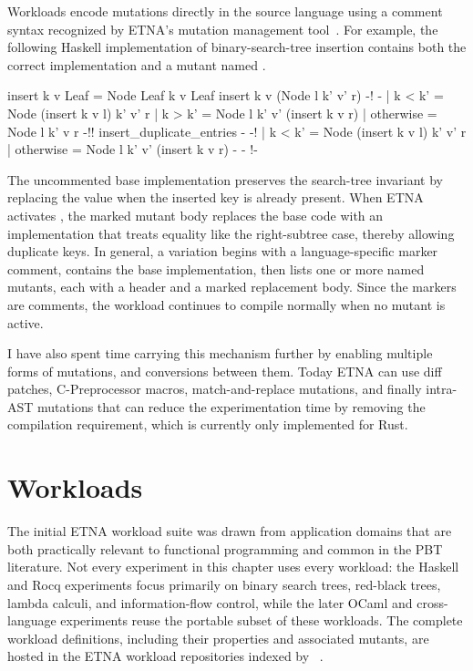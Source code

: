 Workloads encode mutations directly in the source language using a comment syntax
recognized by ETNA's mutation management tool~\cite{marauders}. For example, the
following Haskell implementation of binary-search-tree insertion contains both the
correct implementation and a mutant named .

\begin{code}[language=Haskell,emph={insert,Node,Leaf,otherwise},emph={[2]k,v,l,r,k',v'}]
insert k v Leaf = Node Leaf k v Leaf
insert k v (Node l k' v' r)
  {-! -}
  | k < k' = Node (insert k v l) k' v' r
  | k > k' = Node l k' v' (insert k v r)
  | otherwise = Node l k' v r
  {-!! insert_duplicate_entries -}
  {-!
  | k < k' = Node (insert k v l) k' v' r
  | otherwise = Node l k' v' (insert k v r)
  -}
  {- !-}
\end{code}

The uncommented base implementation preserves the search-tree invariant by replacing
the value when the inserted key is already present. When ETNA activates
, the marked mutant body replaces the base code with an
implementation that treats equality like the right-subtree case, thereby allowing
duplicate keys. In general, a variation begins with a language-specific marker comment,
contains the base implementation, then lists one or more named mutants, each with a
header and a marked replacement body. Since the markers are comments, the workload
continues to compile normally when no mutant is active.

I have also spent time carrying this mechanism further by enabling multiple forms of
mutations, and conversions between them. Today ETNA can use diff patches,
C-Preprocessor macros, match-and-replace mutations, and finally intra-AST mutations
that can reduce the experimentation time by removing the compilation requirement, which
is currently only implemented for Rust.

\section{Workloads} \label{etna:workloads}

The initial ETNA workload suite was drawn from application domains that are both
practically relevant to functional programming and common in the PBT literature. Not
every experiment in this chapter uses every workload: the Haskell and Rocq experiments
focus primarily on binary search trees, red-black trees, lambda calculi, and
information-flow control, while the later OCaml and cross-language experiments reuse
the portable subset of these workloads. The complete workload definitions, including
their properties and associated mutants, are hosted in the ETNA workload repositories
indexed by ~\cite{etna-index}.

